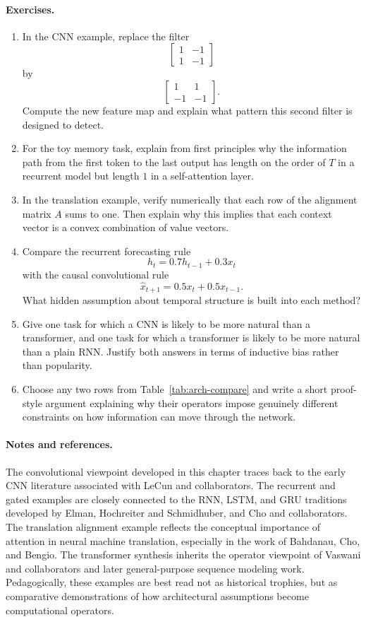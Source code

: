 \paragraph{Exercises.}
\begin{enumerate}
    \item In the CNN example, replace the filter
    \[
    \begin{bmatrix}1 & -1\\ 1 & -1\end{bmatrix}
    \]
    by
    \[
    \begin{bmatrix}1 & 1\\ -1 & -1\end{bmatrix}.
    \]
    Compute the new feature map and explain what pattern this second filter is designed to detect.
    \item For the toy memory task, explain from first principles why the information path from the first token to the last output has length on the order of $T$ in a recurrent model but length $1$ in a self-attention layer.
    \item In the translation example, verify numerically that each row of the alignment matrix $A$ sums to one.
    Then explain why this implies that each context vector is a convex combination of value vectors.
    \item Compare the recurrent forecasting rule
    \[
    h_t=0.7h_{t-1}+0.3x_t
    \]
    with the causal convolutional rule
    \[
    \hat{x}_{t+1}=0.5x_t+0.5x_{t-1}.
    \]
    What hidden assumption about temporal structure is built into each method?
    \item Give one task for which a CNN is likely to be more natural than a transformer, and one task for which a transformer is likely to be more natural than a plain RNN.
    Justify both answers in terms of inductive bias rather than popularity.
    \item Choose any two rows from Table~\ref{tab:arch-compare} and write a short proof-style argument explaining why their operators impose genuinely different constraints on how information can move through the network.
\end{enumerate}

\paragraph{Notes and references.}
The convolutional viewpoint developed in this chapter traces back to the early CNN literature associated with LeCun and collaborators.
The recurrent and gated examples are closely connected to the RNN, LSTM, and GRU traditions developed by Elman, Hochreiter and Schmidhuber, and Cho and collaborators.
The translation alignment example reflects the conceptual importance of attention in neural machine translation, especially in the work of Bahdanau, Cho, and Bengio.
The transformer synthesis inherits the operator viewpoint of Vaswani and collaborators and later general-purpose sequence modeling work.
Pedagogically, these examples are best read not as historical trophies, but as comparative demonstrations of how architectural assumptions become computational operators.
